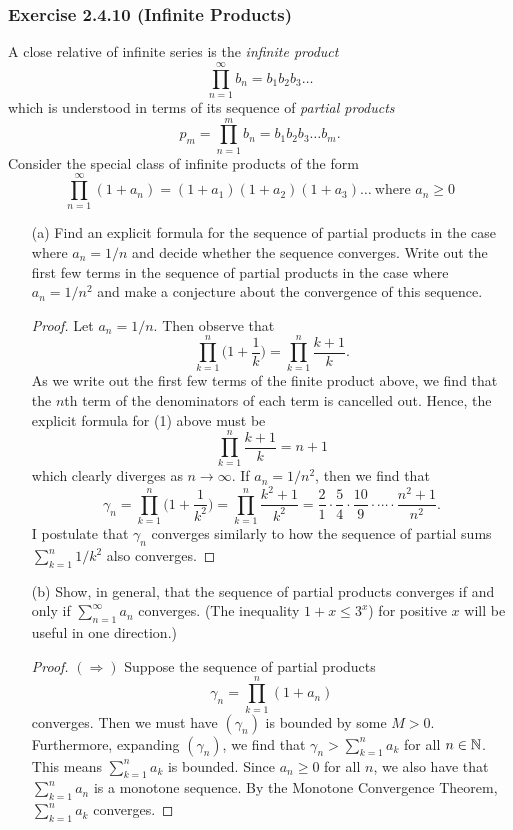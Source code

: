 \subsubsection{Exercise 2.4.10 (Infinite Products)}
A close relative of infinite series is the \textit{infinite product} 
\[ \prod_{n=1}^{ \infty } b_n = b_1 b_2 b_3 \dots \]
which is understood in terms of its sequence of \textit{partial products}
\[ p_m = \prod_{n=1}^m b_n = b_1b_2b_3 \dots b_m.\]
Consider the special class of infinite products of the form 
\[ \prod_{n=1}^{ \infty} (1 + a_n) = (1+a_1)(1+a_2)(1+a_3) \dots ~ \text{where } a_n \geq 0 \]
\begin{enumerate}
    \item[(a)] Find an explicit formula for the sequence of partial products in the case where \( a_n = 1 / n \) and decide whether the sequence converges. Write out the first few terms in the sequence of partial products in the case where \( a_n = 1 / n^2\) and make a conjecture about the convergence of this sequence.
        \begin{proof}
        Let \( a_{n} = 1 / n  \). Then observe that 
        \[  \prod_{k=1}^{n} \Big(  1 + \frac{ 1 }{ k }  \Big) = \prod_{k=1}^{n} \frac{ k+ 1  }{ k }. \tag{1} \] As we write out the first few terms of the finite product above, we find that the \(  n \)th term of the denominators of each term is cancelled out. Hence, the explicit formula for (1) above must be 
        \[  \prod_{k=1}^{n} \frac{ k+1  }{ k }  = n + 1\] which clearly diverges as \( n \to \infty  \). If \( a_{n} = 1/ n^{2} \), then we find that 
        \[ \gamma_n = \prod_{k=1}^{n} \Big( 1 + \frac{ 1 }{ k^{2} }   \Big) = \prod_{k=1}^{n} \frac{ k^{2} + 1  }{ k^{2}  } = \frac{ 2 }{ 1 } \cdot \frac{ 5 }{ 4 } \cdot \frac{ 10 }{ 9 } \cdot \dotsb \cdot \frac{ n^{2} + 1  }{ n^{2} }. \] I postulate that \( \gamma_n  \) converges similarly to how the sequence of partial sums \( \sum_{ k=1 }^{ n } 1 / k^{2} \) also converges.
        \end{proof}
    \item[(b)] Show, in general, that the sequence of partial products converges if and only if \( \sum_{n=1}^{ \infty} a_n \) converges. (The inequality \( 1 + x \leq 3^x\)) for positive \( x \) will be useful in one direction.)
        \begin{proof}
        \( (\Rightarrow)  \) Suppose the sequence of partial products 
        \[  \gamma_n = \prod_{k=1}^{n} ( 1 + a_{n} )\] converges. Then we must have \( (\gamma_{n}) \) is bounded by some \( M > 0  \). Furthermore, expanding \( (\gamma_{n}) \), we find that \(  \gamma_{n} > \sum_{ k=1 }^{ n } a_{k}    \) for all \(  n \in \mathbb{N}  \). This means \( \sum_{ k=1 }^{ n } a_{k }  \) is bounded. Since \( a_{n} \geq 0  \) for all \( n  \), we also have that \( \sum_{ k=1 }^{ n } a_{n}   \) is a monotone sequence. By the Monotone Convergence Theorem, \( \sum_{ k=1 }^{ n } a_{k } \) converges.


\end{proof}
\end{enumerate}
